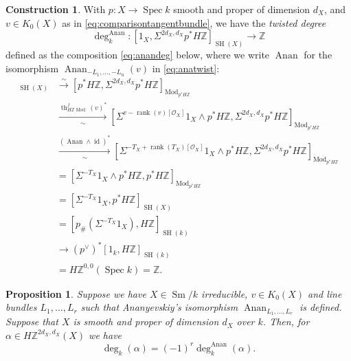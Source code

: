 \documentclass[10pt]{amsart}
\theoremstyle{definition}
\newtheorem{constr}[defn]{Construction}
\theoremstyle{plain}
\newtheorem{prop}[defn]{Proposition}
\numberwithin{equation}{section}
\newcommand{\0}{\emptyset}
\newcommand{\sO}{{\mathcal O}}
\newcommand{\Z}{{\mathbb Z}}
\newcommand{\Spec}{{\operatorname{Spec}}}
\newcommand{\SH}{{\operatorname{SH}}}
\newcommand{\Sm}{{\operatorname{Sm}}}
\renewcommand{\th}{{\operatorname{th}}}
\renewcommand{\deg}{{\operatorname{deg}}}
\newcommand{\Mod}{{\operatorname{Mod}}}
\newcommand{\rnk}{{\operatorname{rank}}}
\newcommand{\id}{{\operatorname{id}}}
\newcommand{\Anan}{{\operatorname{Anan}}}
\begin{document}
\begin{constr}
\label{constr:AnaDegree}
With $p:X\to \Spec k$ smooth and proper of dimension $d_X$, and $v \in K_0(X)$ as in \eqref{eq:comparisontangentbundle}, we have the \emph{twisted degree}
\[
\deg^\Anan_k:[1_X, \Sigma^{2d_X, d_X}p^*H\Z]_{\SH(X)}\to 
\Z
\]
defined as the composition \eqref{eq:anandeg} below, where we write $\Anan$ for the isomorphism $\Anan_{-L_1, \ldots, -L_n}(v)$ in \eqref{eq:anatwist}:
\begin{align*}
[1_X, \Sigma^{2d_X, d_X}p^*H\Z]_{\SH(X)}&\xrightarrow{\sim}
[p^*H\Z, \Sigma^{2d_X, d_X}p^*H\Z]_{\Mod_{p^*H\Z}}\\
&\xrightarrow[\sim]{\th_{H\Z\Mod}^f(v)^*}[\Sigma^{v-\rnk(v)[\sO_X]}1_X\wedge p^*H\Z, \Sigma^{2d_X, d_X}p^*H\Z]_{\Mod_{p^*H\Z}}\\
&\xrightarrow[\sim]{(\Anan \wedge\id)^*}[\Sigma^{-T_X+\rnk(T_X)[\sO_X]}1_X\wedge  p^*H\Z, \Sigma^{2d_X, d_X}p^*H\Z]_{\Mod_{p^*H\Z}}\\
&=[\Sigma^{-T_X}1_X\wedge  p^*H\Z, p^*H\Z]_{\Mod_{p^*H\Z}}\\
&=[\Sigma^{-T_X}1_X, p^*H\Z]_{\SH(X)}\\
&=[p_\#(\Sigma^{-T_X}1_X), H\Z]_{\SH(k)}\\
&\rightarrow{(p^\vee)^*}[1_k,H\Z]_{\SH(k)}\\
&=H\Z^{0,0}(\Spec k)=\Z.
\end{align*}
\begin{equation}
    \label{eq:anandeg}
\end{equation}
\end{constr}

\begin{prop}
\label{prop:comparisondegrees}
Suppose we have $X\in \Sm/k$ irreducible, $v\in K_0(X)$ and line bundles $L_1,\ldots, L_r$ such that Ananyevskiy's isomorphism $\Anan_{L_1,\ldots, L_r}$ is defined. Suppose that $X$ is smooth and proper of dimension $d_X$ over $k$. Then, for $\alpha\in H\Z^{2d_X, d_X}(X)$ we have
\[
\deg_k(\alpha)=(-1)^r\deg^\Anan_k(\alpha).
\]
\end{prop}
\end{document}
